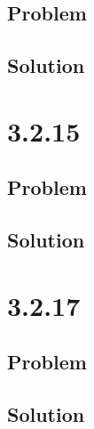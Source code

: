 \documentclass[12pt]{article}
\begin{document}
\subsection*{Problem}

\subsection*{Solution}



\section*{3.2.15}

\subsection*{Problem}

\subsection*{Solution}



\section*{3.2.17}

\subsection*{Problem}

\subsection*{Solution}
\end{document}

